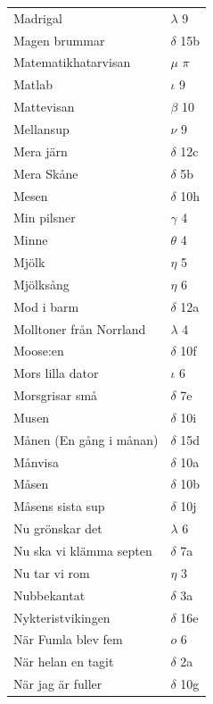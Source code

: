 \documentclass[a6paper,10pt]{article}
\begin{document}
\newpage
\begin{table}[!h]
\begin{tabular}{l l}
Madrigal&	$\lambda$ 9\\
Magen brummar&	$\delta$ 15b\\
Matematikhatarvisan& $\mu$ $\pi$\\
Matlab	&$\iota$ 9\\
Mattevisan&	$\beta$ 10\\
Mellansup	&$\nu$ 9\\
Mera järn&	$\delta$ 12c\\
Mera Skåne	&$\delta$ 5b\\
Mesen&	$\delta$ 10h\\
Min pilsner	&$\gamma$ 4\\
Minne&	$\theta$ 4\\
Mjölk	&$\eta$ 5\\
Mjölksång&	$\eta$ 6\\
Mod i barm&$\delta$ 12a\\
Molltoner från Norrland&	$\lambda$ 4\\
Moose:en	&$\delta$ 10f\\
Mors lilla dator&	$\iota$ 6\\
Morsgrisar små&	$\delta$ 7e\\
Musen	&$\delta$ 10i\\
Månen (En gång i månan)&	$\delta$ 15d\\
Månvisa&	$\delta$ 10a\\
Måsen	&$\delta$ 10b\\
Måsens sista sup&	$\delta$ 10j\\
Nu grönskar det&	$\lambda$ 6\\
Nu ska vi klämma septen	&$\delta$ 7a\\
Nu tar vi rom&	$\eta$ 3\\
Nubbekantat&	$\delta$ 3a\\
Nykteristvikingen&  $\delta$ 16e\\
När Fumla blev fem&  $o$ 6\\
När helan en tagit	&$\delta$ 2a\\
När jag är fuller&	$\delta$ 10g\\
\end{tabular}
\end{table}
\end{document}
